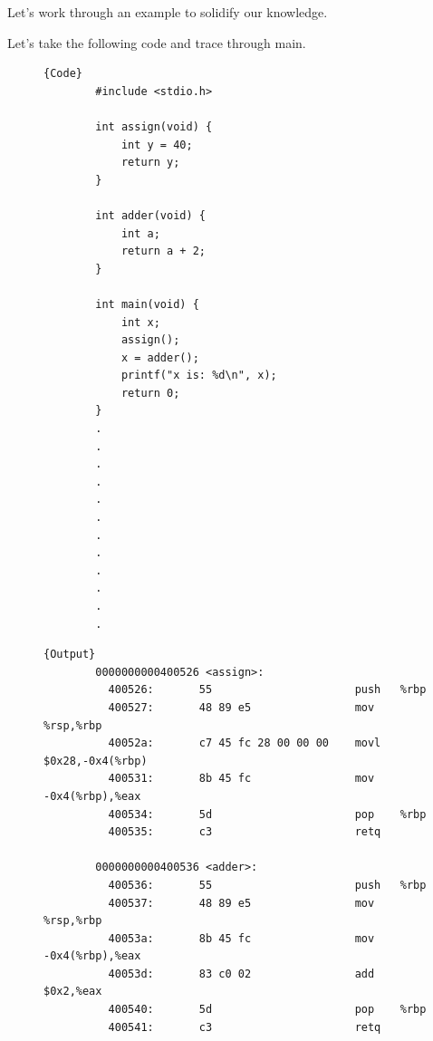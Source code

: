   Let's work through an example to solidify our knowledge. 

  \begin{example}
    Let's take the following code and trace through main. 
    \begin{figure}[H]
      \centering 
      \noindent\begin{minipage}{.25\textwidth}
      \begin{lstlisting}[]{Code}
        #include <stdio.h>

        int assign(void) {
            int y = 40;
            return y;
        }

        int adder(void) {
            int a;
            return a + 2;
        }

        int main(void) {
            int x;
            assign();
            x = adder();
            printf("x is: %d\n", x);
            return 0;
        }
        .
        .
        .
        .
        .
        .
        .
        .
        .
        .
        .
        .
      \end{lstlisting}
      \end{minipage}
      \hfill
      \begin{minipage}{.74\textwidth}
      \begin{lstlisting}[]{Output}
        0000000000400526 <assign>:
          400526:       55                      push   %rbp
          400527:       48 89 e5                mov    %rsp,%rbp
          40052a:       c7 45 fc 28 00 00 00    movl   $0x28,-0x4(%rbp)
          400531:       8b 45 fc                mov    -0x4(%rbp),%eax
          400534:       5d                      pop    %rbp
          400535:       c3                      retq

        0000000000400536 <adder>:
          400536:       55                      push   %rbp
          400537:       48 89 e5                mov    %rsp,%rbp
          40053a:       8b 45 fc                mov    -0x4(%rbp),%eax
          40053d:       83 c0 02                add    $0x2,%eax
          400540:       5d                      pop    %rbp
          400541:       c3                      retq


\end{lstlisting}
\end{minipage}
\end{figure}
\end{example}
